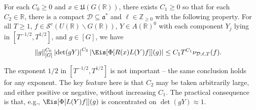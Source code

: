 \begin{lemma}\label{lem:standard2:crude-growth-bounds-completed-eisenstein-series}
  For each $C_0 \geq 0$ and $x \in \mathfrak{U}(G(\mathbb{R}))$, there exists $C_1 \geq 0$ so that for each $C_2 \in \mathbb{R}$, there is a compact $\mathcal{D} \subseteq \mathfrak{a}^*$  and $\ell \in \mathbb{Z}_{\geq 0}$ with the following property.  For all $T \geq 1$, $f \in \mathcal{S}^e(U(\mathbb{R}) \backslash G(\mathbb{R}))$, $Y \in A(\mathbb{R})^0$ with each component $Y_j$ lying in $[T^{-1/2}, T^{1/2}]$, and $g \in [G]$, we have
  \begin{equation*}
    \|g\|_{[G]}^{C_0}
    \left\lvert     \det(g Y) \right\rvert^{C_2}
    \left\lvert \Eis[\Phi[ R(x) L(Y) f]](g) \right\rvert
    \leq C_1 T^{C_1} \nu_{\mathcal{D},\ell,T}(f).
  \end{equation*}
\end{lemma}
\begin{remark}
  The exponent $1/2$ in $[T^{-1/2}, T^{1/2}]$ is not important -- the same conclusion holds for any exponent.  The key feature here is that $C_2$ may be taken arbitrarily large, and either positive or negative, without increasing $C_1$.  The practical consequence is that, e.g., $\Eis[\Phi[L(Y) f]](g)$ is concentrated on $\det(g Y) \approx 1$.
\end{remark}
